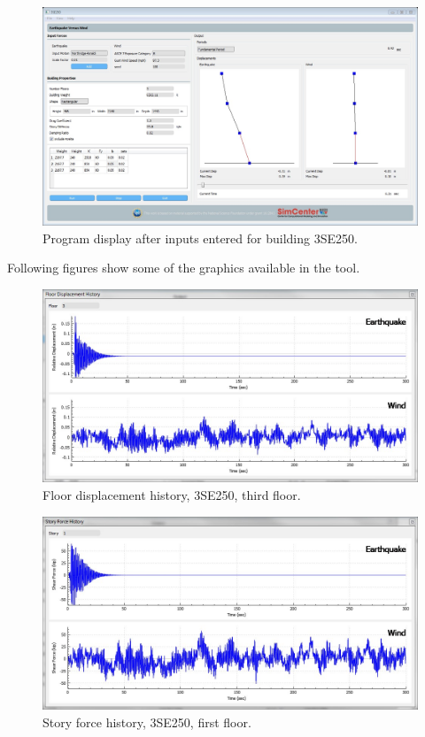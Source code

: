 \documentclass{simcenterdocumentation}
\begin{document}
\begin{figure}[H]
	\centering \includegraphics[width=0.9\linewidth]{3SE250_1.jpg}
	\caption{Program display after inputs entered for building 3SE250.}
\end{figure}
Following figures show some of the graphics available in the tool.
\begin{figure}[H]
	\centering \includegraphics[scale=0.35]{3SE250_fdh.JPG}
	\caption{Floor displacement history, 3SE250, third floor.}
\end{figure}
\begin{figure}[H]
	\centering \includegraphics[scale=0.35]{3SE250_sfh.JPG}
	\caption{Story force history, 3SE250, first floor.}
\end{figure}
\end{document}
